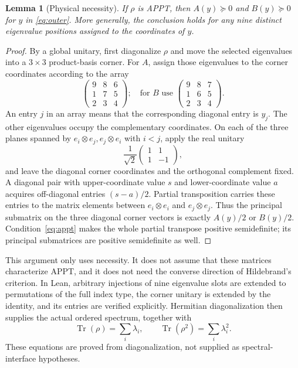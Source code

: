 \documentclass[11pt]{article}
\newtheorem{lemma}[theorem]{Lemma}
\theoremstyle{remark}\newtheorem{remark}[theorem]{Remark}
\newcommand{\Tr}{\operatorname{Tr}}
\begin{document}
\begin{lemma}[Physical necessity]\label{lem:necessity}
If $\rho$ is APPT, then $A(y)\succeq0$ and $B(y)\succeq0$ for $y$ in \eqref{eq:outer}. More generally, the conclusion holds for any nine distinct eigenvalue positions assigned to the coordinates of $y$.
\end{lemma}
\begin{proof}
By a global unitary, first diagonalize $\rho$ and move the selected eigenvalues into a $3\times3$ product-basis corner. For $A$, assign those eigenvalues to the corner coordinates according to the array
\[
 \begin{pmatrix}9&8&6\\1&7&5\\2&3&4\end{pmatrix};
 \quad\text{for }B\text{ use }
 \begin{pmatrix}9&8&7\\1&6&5\\2&3&4\end{pmatrix}.
\]
An entry $j$ in an array means that the corresponding diagonal entry is $y_j$. The other eigenvalues occupy the complementary coordinates. On each of the three planes spanned by $e_i\otimes e_j,e_j\otimes e_i$ with $i<j$, apply the real unitary
\[
 \frac1{\sqrt2}\begin{pmatrix}1&1\\1&-1\end{pmatrix},
\]
and leave the diagonal corner coordinates and the orthogonal complement fixed. A diagonal pair with upper-coordinate value $s$ and lower-coordinate value $a$ acquires off-diagonal entries $(s-a)/2$. Partial transposition carries these entries to the matrix elements between $e_i\otimes e_i$ and $e_j\otimes e_j$. Thus the principal submatrix on the three diagonal corner vectors is exactly $A(y)/2$ or $B(y)/2$. Condition~\eqref{eq:appt} makes the whole partial transpose positive semidefinite; its principal submatrices are positive semidefinite as well.
\end{proof}

This argument only uses necessity. It does not assume that these matrices characterize APPT, and it does not need the converse direction of Hildebrand's criterion. In Lean, arbitrary injections of nine eigenvalue slots are extended to permutations of the full index type, the corner unitary is extended by the identity, and its entries are verified explicitly. Hermitian diagonalization then supplies the actual ordered spectrum, together with
\begin{equation}\label{eq:moments}
 \Tr(\rho)=\sum_i\lambda_i,\qquad
 \Tr(\rho^2)=\sum_i\lambda_i^2.
\end{equation}
These equations are proved from diagonalization, not supplied as spectral-interface hypotheses.
\end{document}
